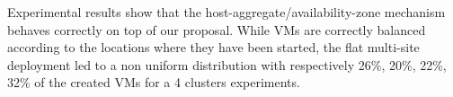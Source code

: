 
Experimental  results show  that the  host-aggregate/availability-zone mechanism
behaves  correctly on  top of  our proposal.  While VMs  are correctly  balanced
according to  the locations where  they have  been started, the  flat multi-site
deployment led to a non uniform distribution with respectively 26\%, 20\%, 22\%,
32\% of the created VMs for a 4 clusters experiments.
